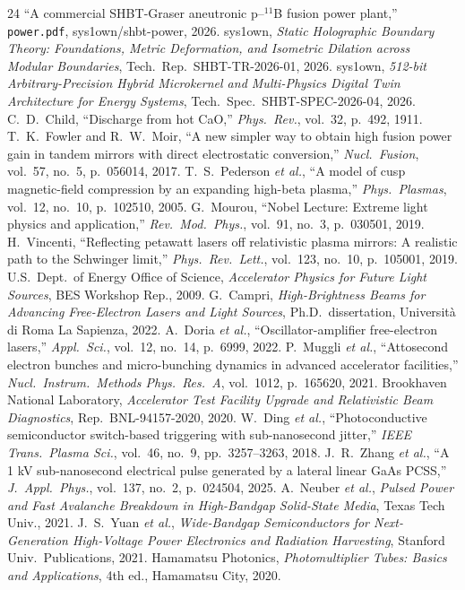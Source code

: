 \documentclass[10pt,journal,compsoc]{IEEEtran}
\begin{document}
\begin{thebibliography}{24}
 ``A commercial SHBT-Graser aneutronic p--$^{11}$B
  fusion power plant,'' \texttt{power.pdf}, sys1own/shbt-power, 2026.
 sys1own, \emph{Static Holographic Boundary
  Theory: Foundations, Metric Deformation, and Isometric Dilation across
  Modular Boundaries}, Tech.\ Rep.\ SHBT-TR-2026-01, 2026.
 sys1own, \emph{512-bit Arbitrary-Precision
  Hybrid Microkernel and Multi-Physics Digital Twin Architecture for
  Energy Systems}, Tech.\ Spec.\ SHBT-SPEC-2026-04, 2026.
 C.~D.~Child, ``Discharge from hot CaO,''
  \emph{Phys.\ Rev.}, vol.~32, p.~492, 1911.
 T.~K.~Fowler and R.~W.~Moir, ``A new simpler way to
  obtain high fusion power gain in tandem mirrors with direct electrostatic
  conversion,'' \emph{Nucl.\ Fusion}, vol.~57, no.~5, p.~056014, 2017.
 T.~S.~Pederson \emph{et al.}, ``A model of cusp
  magnetic-field compression by an expanding high-beta plasma,''
  \emph{Phys.\ Plasmas}, vol.~12, no.~10, p.~102510, 2005.
 G.~Mourou, ``Nobel Lecture: Extreme light physics and
  application,'' \emph{Rev.\ Mod.\ Phys.}, vol.~91, no.~3, p.~030501, 2019.
 H.~Vincenti, ``Reflecting petawatt lasers off
  relativistic plasma mirrors: A realistic path to the Schwinger limit,''
  \emph{Phys.\ Rev.\ Lett.}, vol.~123, no.~10, p.~105001, 2019.
 U.S.~Dept.\ of Energy Office of Science,
  \emph{Accelerator Physics for Future Light Sources}, BES Workshop Rep.,
  2009.
 G.~Campri, \emph{High-Brightness Beams for Advancing
  Free-Electron Lasers and Light Sources}, Ph.D.\ dissertation,
  Universit\`a di Roma La Sapienza, 2022.
 A.~Doria \emph{et al.}, ``Oscillator-amplifier
  free-electron lasers,'' \emph{Appl.\ Sci.}, vol.~12, no.~14, p.~6999,
  2022.
 P.~Muggli \emph{et al.}, ``Attosecond electron
  bunches and micro-bunching dynamics in advanced accelerator
  facilities,'' \emph{Nucl.\ Instrum.\ Methods Phys.\ Res.\ A},
  vol.~1012, p.~165620, 2021.
 Brookhaven National Laboratory, \emph{Accelerator
  Test Facility Upgrade and Relativistic Beam Diagnostics}, Rep.\
  BNL-94157-2020, 2020.
 W.~Ding \emph{et al.}, ``Photoconductive
  semiconductor switch-based triggering with sub-nanosecond jitter,''
  \emph{IEEE Trans.\ Plasma Sci.}, vol.~46, no.~9, pp.~3257--3263, 2018.
\bibitem{gaas_pulse2025} J.~R.~Zhang \emph{et al.}, ``A 1 kV
  sub-nanosecond electrical pulse generated by a lateral linear GaAs
  PCSS,'' \emph{J.\ Appl.\ Phys.}, vol.~137, no.~2, p.~024504, 2025.
\bibitem{neuber2021} A.~Neuber \emph{et al.}, \emph{Pulsed Power and Fast
  Avalanche Breakdown in High-Bandgap Solid-State Media}, Texas Tech
  Univ., 2021.
 J.~S.~Yuan \emph{et al.}, \emph{Wide-Bandgap
  Semiconductors for Next-Generation High-Voltage Power Electronics and
  Radiation Harvesting}, Stanford Univ.\ Publications, 2021.
 Hamamatsu Photonics, \emph{Photomultiplier Tubes:
  Basics and Applications}, 4th ed., Hamamatsu City, 2020.
\end{thebibliography}
\end{document}
